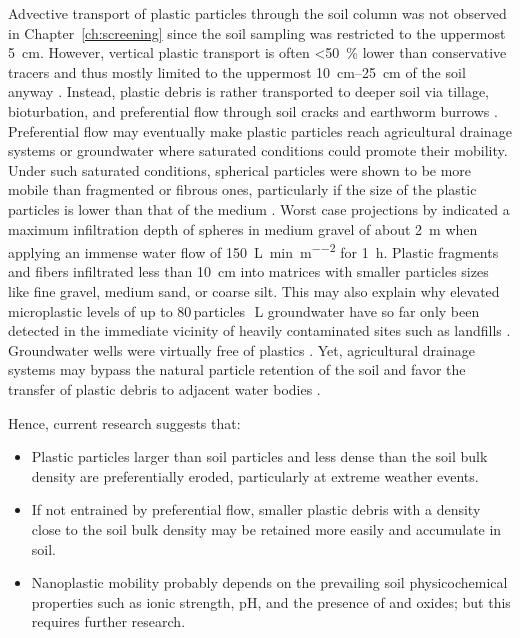 Advective transport of plastic particles through the soil column was not observed in Chapter~\ref{ch:screening} since the soil sampling was restricted to the uppermost \SI{5}{\centi\meter}. However, vertical plastic transport is often \SI{<50}{\percent} lower than conservative tracers and thus mostly limited to the uppermost \SIrange{10}{25}{\centi\meter} of the soil anyway \citep{KellerTransport2020,WuTransport2020}. Instead, plastic debris is rather transported to deeper soil via tillage, bioturbation, and preferential flow through soil cracks and earthworm burrows \citep{RilligMicroplastic2017a,YuLeaching2019,LiVertical2021,HeinzeNanoplastic2021}. Preferential flow may eventually make plastic particles reach agricultural drainage systems \citep{BigalkeMicroplastics2022} or groundwater where saturated conditions could promote their mobility. Under such saturated conditions, spherical particles were shown to be more mobile than fragmented or fibrous ones, particularly if the size of the plastic particles is lower than that of the medium \citep{WaldschlagerInfiltration2020}. Worst case projections by \citet{WaldschlagerInfiltration2020} indicated a maximum infiltration depth of spheres in medium gravel of about \SI{2}{\meter} when applying an immense water flow of \SI{150}{\liter\per\minute\per\square\meter} for \SI{1}{\hour}. Plastic fragments and fibers infiltrated less than \SI{10}{\centi\meter} into matrices with smaller particles sizes like fine gravel, medium sand, or coarse silt.
This may also explain why elevated microplastic levels of up to \num{80}\,particles\,\si{\per\liter} groundwater have so far only been detected in the immediate vicinity of heavily contaminated sites such as landfills \citep{ManikandaBharathSpatial2021}. Groundwater wells were virtually free of plastics \citep{MintenigLow2019}. Yet, agricultural drainage systems may bypass the natural particle retention of the soil and favor the transfer of plastic debris to adjacent water bodies \citep{BigalkeMicroplastics2022}.

Hence, current research suggests that:
\begin{itemize}
	\item Plastic particles larger than soil particles and less dense than the soil bulk density are preferentially eroded, particularly at extreme weather events.
	\item If not entrained by preferential flow, smaller plastic debris with a density close to the soil bulk density may be retained more easily and accumulate in soil.
	\item Nanoplastic mobility probably depends on the prevailing soil physicochemical properties such as ionic strength, pH, and the presence of  and  oxides; but this requires further research.
\end{itemize}

